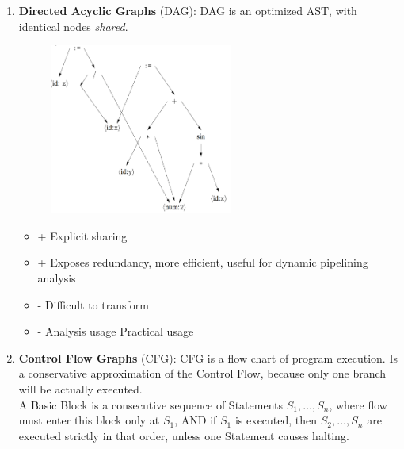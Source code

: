 \documentclass[a4paper]{exam}
\theoremstyle{definition}
\begin{document}
\begin{enumerate}
\begin{enumerate}
          \item \textbf{Directed Acyclic Graphs} (DAG): DAG is an optimized AST, with identical nodes \textit{shared}.\\
                \begin{figure}[htbp]
                  \centering
                  \includegraphics[width=6cm]{img/dag.png}
                \end{figure}
                \begin{itemize}
                  \item + Explicit sharing
                  \item + Exposes redundancy, more efficient, useful for dynamic pipelining analysis
                  \item - Difficult to transform
                  \item - Analysis usage Practical usage
                \end{itemize}
          \item \textbf{Control Flow Graphs} (CFG): CFG is a flow chart of program execution. Is a conservative approximation of the Control Flow, because only one branch will be actually executed.\\
                A Basic Block is a consecutive sequence of Statements $S_{1}, \ldots, S_{n}$, where flow must enter this block only at $S_{1}$, AND if $S_{1}$ is executed, then $S_{2}, \ldots, S_{n}$ are executed strictly in that order, unless one Statement causes halting.


\end{enumerate}
\end{enumerate}
\end{document}
